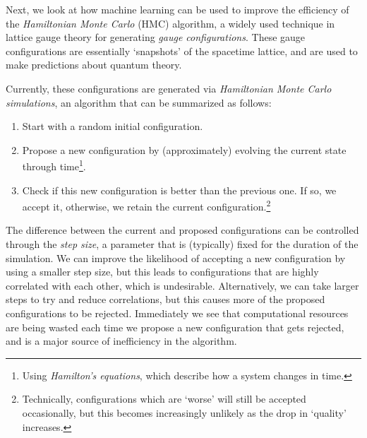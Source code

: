 \begin{doublespace}
Next, we look at how machine learning can be used to improve the efficiency of the \emph{Hamiltonian Monte Carlo} (HMC)
algorithm, a widely used technique in lattice gauge theory for generating \emph{gauge configurations}.
%
These gauge configurations are essentially `snapshots' of the spacetime lattice, and are used to make predictions
about quantum theory.

%
Currently, these configurations are generated via \emph{Hamiltonian Monte Carlo
simulations}, an algorithm that can be summarized as follows:
%
\begin{enumerate}
  \item Start with a random initial configuration.
  \item Propose a new configuration by (approximately) evolving the current
    state through time\footnote{Using \emph{Hamilton's equations}, which
    describe how a system changes in time.}.
  \item Check if this new configuration is better than the previous one. If so,
    we accept it, otherwise, we retain the current
    configuration.\footnote{Technically, configurations which are `worse' will
      still be accepted occasionally, but this becomes increasingly
    unlikely as the drop in `quality' increases.}
\end{enumerate}
%
The difference between the current and proposed configurations can be
controlled through the \emph{step size}, a parameter that is (typically) fixed
for the duration of the simulation.
%
We can improve the likelihood of accepting a new configuration by using a
smaller step size, but this leads to configurations that are highly correlated
with each other, which is undesirable.
%
Alternatively, we can take larger steps to try and reduce correlations, but
this causes more of the proposed configurations to be rejected.
%
Immediately we see that computational resources are being wasted each time we
propose a new configuration that gets rejected, and is a major source of
inefficiency in the algorithm.


\end{doublespace}
